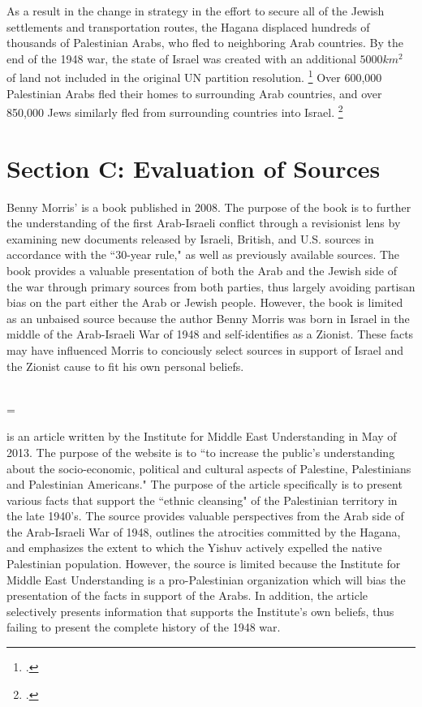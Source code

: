 \documentclass[12pt]{turabian-researchpaper}
\begin{document}
As a result in the change in strategy in the effort to secure all of the Jewish settlements and transportation routes, the Hagana displaced hundreds of thousands of Palestinian Arabs, who fled to neighboring Arab countries.  By the end of the 1948 war, the state of Israel was created with an additional $5000km^2$ of land not included in the original UN partition resolution.
\footcite{lorch}
Over 600,000 Palestinian Arabs fled their homes to surrounding Arab countries, and over 850,000 Jews similarly fled from surrounding countries into Israel.
\footcite{bartal}


\section{Section C: Evaluation of Sources}
\noindent {}



Benny Morris'  is a book published in 2008.  The purpose of the book is to further the understanding of the first Arab-Israeli conflict through a revisionist lens by examining new documents released by Israeli, British, and U.S. sources in accordance with the ``30-year rule," as well as previously available sources.  The book provides a valuable presentation of both the Arab and the Jewish side of the war through primary sources from both parties, thus largely avoiding partisan bias on the part either the Arab or Jewish people.  However, the book is limited as an unbaised source because the author Benny Morris was born in Israel in the middle of the Arab-Israeli War of 1948 and self-identifies as a Zionist.  These facts may have influenced Morris to conciously select sources in support of Israel and the Zionist cause to fit his own personal beliefs.



~\\



\hangindent=\parindent \noindent {}



 is an article written by the Institute for Middle East Understanding in May of 2013.  The purpose of the website is to ``to increase the public's understanding about the socio-economic, political and cultural aspects of Palestine, Palestinians and Palestinian Americans."  The purpose of the article specifically is to present various facts that support the ``ethnic cleansing" of the Palestinian territory in the late 1940's.  The source provides valuable perspectives from the Arab side of the Arab-Israeli War of 1948, outlines the atrocities committed by the Hagana, and emphasizes the extent to which the Yishuv actively expelled the native Palestinian population.  However, the source is limited because the Institute for Middle East Understanding is a pro-Palestinian organization which will bias the presentation of the facts in support of the Arabs.  In addition, the article selectively presents information that supports the Institute's own beliefs, thus failing to present the complete history of the 1948 war.
\end{document}
